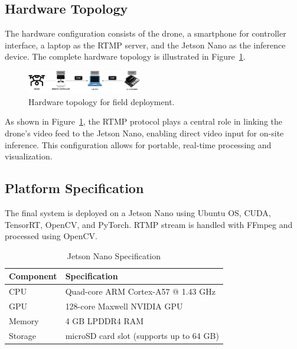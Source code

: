 \subsection{Hardware Topology}

The hardware configuration consists of the drone, a smartphone for controller interface, a laptop as the RTMP server, and the Jetson Nano as the inference device. The complete hardware topology is illustrated in Figure~\ref{fig:topologihardware}.

\begin{figure}[H]
    \centering
    \includegraphics[width=0.45\textwidth]{gambar/topologi-hardware.jpg}
    \caption{Hardware topology for field deployment.}
    \label{fig:topologihardware}
\end{figure}

As shown in Figure~\ref{fig:topologihardware}, the RTMP protocol plays a central role in linking the drone's video feed to the Jetson Nano, enabling direct video input for on-site inference. This configuration allows for portable, real-time processing and visualization.

\subsection{Platform Specification}

The final system is deployed on a Jetson Nano using Ubuntu OS, CUDA, TensorRT, OpenCV, and PyTorch. RTMP stream is handled with FFmpeg and processed using OpenCV.

\begin{table}[H]
\centering
\caption{Jetson Nano Specification}
\label{tab:jetson-specs}
\begin{tabular}{|l|l|}
\hline
\textbf{Component} & \textbf{Specification} \\ \hline
CPU & Quad-core ARM Cortex-A57 @ 1.43 GHz \\ \hline
GPU & 128-core Maxwell NVIDIA GPU \\ \hline
Memory & 4 GB LPDDR4 RAM \\ \hline
Storage & microSD card slot (supports up to 64 GB) \\ \hline
\end{tabular}
\end{table}

